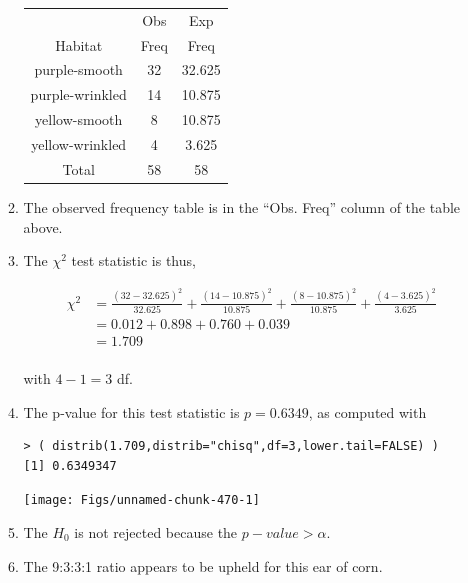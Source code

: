 \documentclass[10pt,openany]{book}\usepackage[]{graphicx}\usepackage[]{color}
\makeatletter
\newenvironment{kframe}{%
 \def\at@end@of@kframe{}%
 \ifinner\ifhmode%
  \def\at@end@of@kframe{\end{minipage}}%
  \begin{minipage}{\columnwidth}%
 \fi\fi%
 \def\FrameCommand##1{\hskip\@totalleftmargin \hskip-\fboxsep
 \colorbox{shadecolor}{##1}\hskip-\fboxsep
     \hskip-\linewidth \hskip-\@totalleftmargin \hskip\columnwidth}%
 \MakeFramed {\advance\hsize-\width
   \@totalleftmargin\z@ \linewidth\hsize
   \@setminipage}}%
 {\par\unskip\endMakeFramed%
 \at@end@of@kframe}
\newenvironment{knitrout}{}{} %
\makeatother
\begin{document}
\begin{itemize}
\begin{enumerate}
        \begin{center}
          \begin{tabular}{ccc}
            \hline\hline
            & Obs & Exp \\
            Habitat & Freq & Freq \\
            \hline
            purple-smooth   & 32 & 32.625 \\
            purple-wrinkled & 14 & 10.875 \\
            yellow-smooth   &  8 & 10.875 \\
            yellow-wrinkled &  4 &  3.625 \\
            \hline
            Total & 58 & 58 \\
            \hline\hline
          \end{tabular}
        \end{center}
      \item The observed frequency table is in the ``Obs. Freq'' column of the table above.
      \item The $\chi^{2}$ test statistic is thus,
        \begin{center}
          \[  \begin{split}
            \chi^{2} &= \frac{(32-32.625)^{2}}{32.625} + \frac{(14-10.875)^{2}}{10.875} + \frac{(8-10.875)^{2}}{10.875} + \frac{(4-3.625)^{2}}{3.625} \\
            &= 0.012 + 0.898 + 0.760 + 0.039 \\
            & = 1.709 \\
          \end{split}  \]
        \end{center}
        with $4-1=3$ df.
      \item The p-value for this test statistic is $p=0.6349$, as computed with
\begin{knitrout}
\color{fgcolor}\begin{kframe}
\begin{verbatim}
> ( distrib(1.709,distrib="chisq",df=3,lower.tail=FALSE) )
[1] 0.6349347
\end{verbatim}
\end{kframe}

{\centering \texttt{[image: Figs/unnamed-chunk-470-1]} 

}



\end{knitrout}
      \item The $H_{0}$ is not rejected because the $p-value>\alpha$.
      \item The 9:3:3:1 ratio appears to be upheld for this ear of corn.
    \end{enumerate}


\end{itemize}
\end{document}

